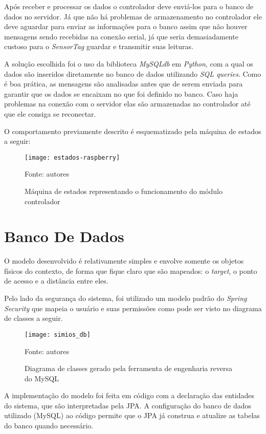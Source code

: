 Após receber e processar os dados o controlador deve enviá-los para o banco de dados no servidor. Já que não há problemas de armazenamento no controlador ele deve aguardar para enviar as informações para o banco assim que não houver mensagens sendo recebidas na conexão serial, já que seria demasiadamente custoso para o \emph{SensorTag} guardar e transmitir suas leituras.

A solução escolhida foi o uso da biblioteca \emph{MySQLdb} em \emph{Python}, com a qual os dados são inseridos diretamente no banco de dados utilizando \emph{SQL queries}. Como é boa prática, as mensagens são analisadas antes que de serem enviada para garantir que os dados se encaixam no que foi definido no banco. Caso haja problemas na conexão com o servidor elas são armazenadas no controlador até que ele consiga se reconectar.

O comportamento previamente descrito é esquematizado pela máquina de estados a seguir:

\begin{figure}[ht]
  \centering
    \caption{Máquina de estados representando o funcionamento do módulo controlador}
    \texttt{[image: estados-raspberry]}
  \centerline{\small{Fonte: autores}}
\end{figure}
\FloatBarrier

\section{Banco De Dados}

O modelo desenvolvido é relativamente simples e envolve somente os objetos físicos do contexto, de forma que fique claro que são mapeados: o \emph{target}, o ponto de acesso e a distância entre eles.

Pelo lado da segurança do sistema, foi utilizado um modelo padrão do \emph{Spring Security} que mapeia o usuário e suas permissões como pode ser visto no diagrama de classes a seguir.

\begin{figure}[ht]
  \centering
    \caption{Diagrama de classes gerado pela ferramenta de engenharia reversa do MySQL}
    \texttt{[image: simios\_db]}
  \centerline{\small{Fonte: autores}}
\end{figure}
\FloatBarrier

A implementação do modelo foi feita em código com a declaração das entidades do sistema, que são interpretadas pela JPA. A configuração do banco de dados utilizado (MySQL) ao código permite que o JPA já construa e atualize as tabelas do banco quando necessário.

